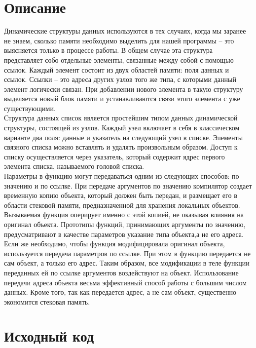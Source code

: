 \section{Описание}

Динамические структуры данных используются в тех случаях, когда мы заранее не знаем, сколько памяти необходимо выделить для нашей программы -- это выясняется только в процессе работы. В общем случае эта структура представляет собо отдельные элементы, связанные между собой с помощью ссылок. Каждый элемент состоит из двух областей памяти: поля данных и ссылок. Ссылки -- это адреса других узлов того же типа, с которыми данный элемент логически связан. При добавлении нового элемента в такую структуру выделяется новый блок памяти и устанавливаются связи этого элемента с уже существующими. \\

Структура данных список является простейшим типом данных динамической структуры, состоящей из узлов. Каждый узел включает в себя в классическом варианте два поля: данные и указатель на следующий узел в списке. Элементы связного списка можно вставлять и удалять произвольным образом. Доступ к списку осуществляется через указатель, который содержит ядрес первого элемента списка, называемого головой списка. \\

Параметры в функцию могут передаваться одним из следующих способов: по значению и по ссылке. При передаче аргументов по значению компилятор создает временную копию объекта, который должен быть передан, и размещает его в области стековой памяти, предназначенной для хранения локальных объектов. Вызываемая функция оперирует именно с этой копией, не оказывая влияния на оригинал объекта. Прототипы функций, принимающих аргументы по значению, предусматривают в качестве параметров указание типа объекта,а не его адреса. Если же необходимо, чтобы функция модифицировала оригинал объекта, используется передача параметров по ссылке. При этом в функцию передается не сам объект, а только его адрес. Таким образом, все модификации в теле функции переданных ей по ссылке аргументов воздействуют на объект. Использование передачи адреса объекта весьма эффективный способ работы с большим числом данных. Кроме того, так как передается адрес, а не сам объект, существенно экономится стековая память. \\


\section{Исходный код}


